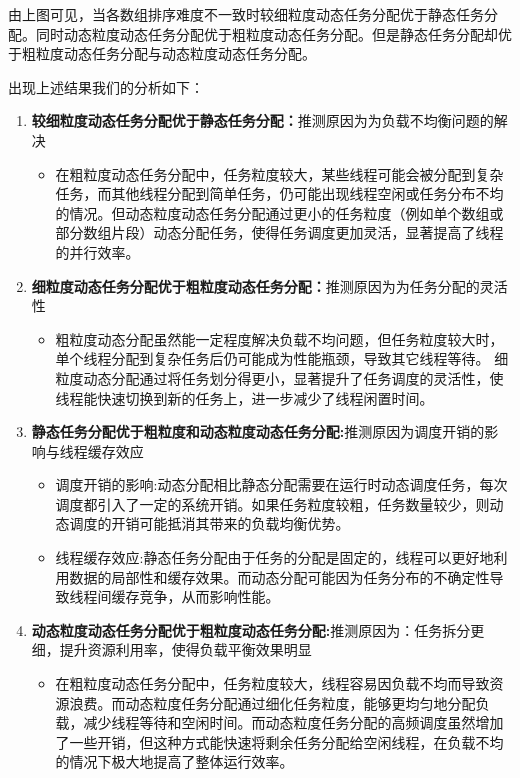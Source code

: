 \documentclass{nku}
\begin{document}
由上图可见，当各数组排序难度不一致时较细粒度动态任务分配优于静态任务分配。同时动态粒度动态任务分配优于粗粒度动态任务分配。但是静态任务分配却优于粗粒度动态任务分配与动态粒度动态任务分配。

出现上述结果我们的分析如下：
\begin{enumerate}
    \item \textbf{较细粒度动态任务分配优于静态任务分配：}推测原因为为负载不均衡问题的解决
    \begin{itemize}
        \item 在粗粒度动态任务分配中，任务粒度较大，某些线程可能会被分配到复杂任务，而其他线程分配到简单任务，仍可能出现线程空闲或任务分布不均的情况。但动态粒度动态任务分配通过更小的任务粒度（例如单个数组或部分数组片段）动态分配任务，使得任务调度更加灵活，显著提高了线程的并行效率。
    \end{itemize}
    \item \textbf{细粒度动态任务分配优于粗粒度动态任务分配：}推测原因为为任务分配的灵活性
    \begin{itemize}
        \item 粗粒度动态分配虽然能一定程度解决负载不均问题，但任务粒度较大时，单个线程分配到复杂任务后仍可能成为性能瓶颈，导致其它线程等待。 细粒度动态分配通过将任务划分得更小，显著提升了任务调度的灵活性，使线程能快速切换到新的任务上，进一步减少了线程闲置时间。
    \end{itemize}
    \item \textbf{静态任务分配优于粗粒度和动态粒度动态任务分配:}推测原因为调度开销的影响与线程缓存效应
    \begin{itemize}
        \item 调度开销的影响:动态分配相比静态分配需要在运行时动态调度任务，每次调度都引入了一定的系统开销。如果任务粒度较粗，任务数量较少，则动态调度的开销可能抵消其带来的负载均衡优势。
        \item 线程缓存效应:静态任务分配由于任务的分配是固定的，线程可以更好地利用数据的局部性和缓存效果。而动态分配可能因为任务分布的不确定性导致线程间缓存竞争，从而影响性能。
    \end{itemize}
    \item \textbf{动态粒度动态任务分配优于粗粒度动态任务分配:}推测原因为：任务拆分更细，提升资源利用率，使得负载平衡效果明显
    \begin{itemize}
        \item 在粗粒度动态任务分配中，任务粒度较大，线程容易因负载不均而导致资源浪费。而动态粒度任务分配通过细化任务粒度，能够更均匀地分配负载，减少线程等待和空闲时间。而动态粒度任务分配的高频调度虽然增加了一些开销，但这种方式能快速将剩余任务分配给空闲线程，在负载不均的情况下极大地提高了整体运行效率。
    \end{itemize}
\end{enumerate}
\end{document}
